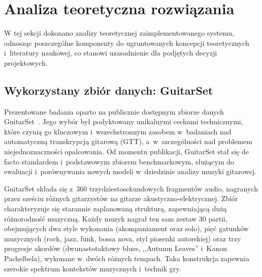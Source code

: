 \section{Analiza teoretyczna rozwiązania}
\label{sec:analiza_teoretyczna_rozwiazania_fakt}

W tej sekcji dokonano analizy teoretycznej zaimplementowanego systemu, odnosząc poszczególne komponenty do ugruntowanych koncepcji teoretycznych i~literatury naukowej, co stanowi uzasadnienie dla podjętych decyzji projektowych.

\subsection{Wykorzystany zbiór danych: GuitarSet}
\label{ssec:analiza_guitarset}

Prezentowane badania oparto na publicznie dostępnym zbiorze danych GuitarSet~\autocite{Xi2018}. Jego wybór był podyktowany unikalnymi cechami technicznymi, które czynią go kluczowym i~wszechstronnym zasobem w~badaniach nad automatyczną transkrypcją gitarową (GTT), a~w~szczególności nad problemem niejednoznaczności opalcowania. Od momentu publikacji, GuitarSet stał się de facto standardem i~podstawowym zbiorem benchmarkowym, służącym do ewaluacji i~porównywania nowych modeli w~dziedzinie analizy muzyki gitarowej.

GuitarSet składa się z~360 trzydziestosekundowych fragmentów audio, nagranych przez sześciu różnych gitarzystów na gitarze akustyczno-elektrycznej. Zbiór charakteryzuje się starannie zaplanowaną strukturą, zapewniającą dużą różnorodność muzyczną. Każdy muzyk nagrał ten sam zestaw 30 partii, obejmujących dwa style wykonania (akompaniament oraz solo), pięć gatunków muzycznych (rock, jazz, funk, bossa nova, styl piosenki autorskiej) oraz trzy progresje akordów (dwunastotaktowy blues, ,,Autumn Leaves'' i~Kanon Pachelbela), wykonane w~dwóch różnych tempach. Taka konstrukcja zapewnia szerokie spektrum kontekstów muzycznych i~technik gry.

